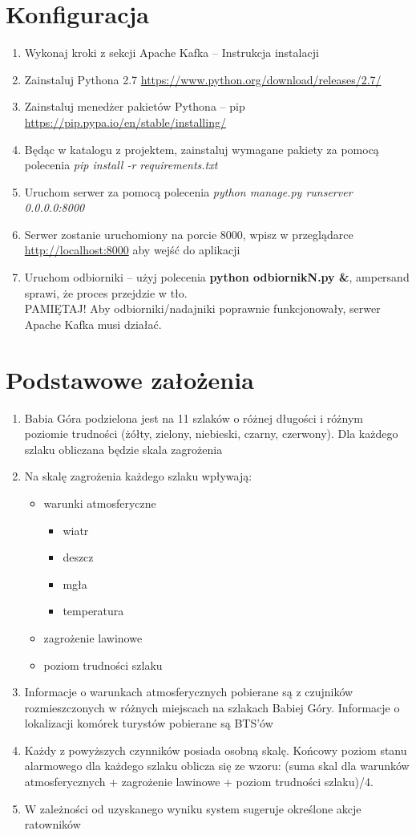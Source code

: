 \documentclass[a4paper,12pt]{article}
\begin{document}
\section{Konfiguracja}
\begin{enumerate}
\item Wykonaj kroki z sekcji Apache Kafka -- Instrukcja instalacji
\item Zainstaluj Pythona 2.7 \url{https://www.python.org/download/releases/2.7/}
\item Zainstaluj menedżer pakietów Pythona -- pip \url{https://pip.pypa.io/en/stable/installing/}
\item Będąc w katalogu z projektem, zainstaluj wymagane pakiety za pomocą polecenia \textit{pip install -r requirements.txt}
\item Uruchom serwer za pomocą polecenia \textit{python manage.py runserver 0.0.0.0:8000}
\item Serwer zostanie uruchomiony na porcie 8000, wpisz w przeglądarce \url{http://localhost:8000} aby wejść do aplikacji
\item Uruchom odbiorniki -- użyj polecenia \textbf{python odbiornikN.py \&}, ampersand sprawi, że proces przejdzie w tło.\\ PAMIĘTAJ! Aby odbiorniki/nadajniki poprawnie funkcjonowały, serwer Apache Kafka musi działać.
\end{enumerate}
\newpage
\section{Podstawowe założenia}
\begin{enumerate}
\item Babia Góra podzielona jest na 11 szlaków o różnej długości i różnym poziomie trudności (żółty, zielony, niebieski, czarny, czerwony). Dla każdego szlaku obliczana będzie skala zagrożenia
\item Na skalę zagrożenia każdego szlaku wpływają:
\begin{itemize}
\item warunki atmosferyczne
\begin{itemize}
\item wiatr
\item deszcz
\item mgła
\item temperatura
\end{itemize}
\item zagrożenie lawinowe
\item poziom trudności szlaku
\end{itemize}
\item Informacje o warunkach atmosferycznych pobierane są z czujników rozmieszczonych w różnych miejscach na szlakach Babiej Góry. Informacje o lokalizacji komórek turystów pobierane są BTS’ów
\item Każdy z powyższych czynników posiada osobną skalę. Końcowy poziom stanu alarmowego dla każdego szlaku oblicza się ze wzoru: (suma skal dla warunków atmosferycznych + zagrożenie lawinowe + poziom trudności szlaku)/4.
\item W zależności od uzyskanego wyniku system sugeruje określone akcje ratowników
\end{enumerate}
\newpage
\end{document}
